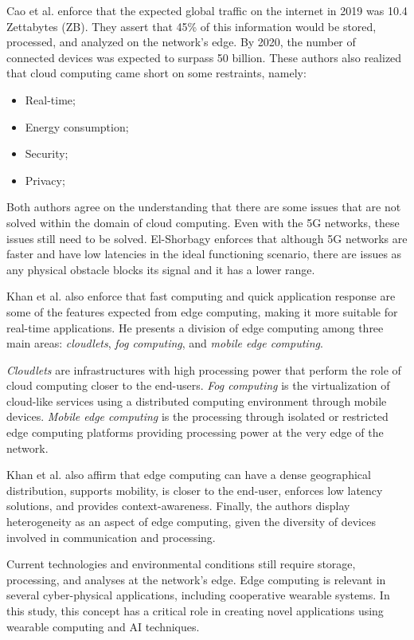 Cao et al. \cite{cao2020overview} enforce that the expected global traffic on the internet in 2019 was 10.4 Zettabytes (ZB). They assert that 45\% of this information would be stored, processed, and analyzed on the network's edge. By 2020, the number of connected devices was expected to surpass 50 billion. These authors also realized that cloud computing came short on some restraints, namely:

\begin{itemize}
    \item Real-time;
    \item Energy consumption;
    \item Security;
    \item Privacy;
\end{itemize}

Both authors agree on the understanding that there are some issues that are not solved within the domain of cloud computing. Even with the 5G networks, these issues still need to be solved. El-Shorbagy \cite{el20215g} enforces that although 5G networks are faster and have low latencies in the ideal functioning scenario, there are issues as any physical obstacle blocks its signal and it has a lower range.

Khan et al. \cite{khan2019edge} also enforce that fast computing and quick application response are some of the features expected from edge computing, making it more suitable for real-time applications. He presents a division of edge computing among three main areas: \textit{cloudlets}, \textit{fog computing}, and \textit{mobile edge computing}. 

\textit{Cloudlets} are infrastructures with high processing power that perform the role of cloud computing closer to the end-users. \textit{Fog computing} is the virtualization of cloud-like services using a distributed computing environment through mobile devices. \textit{Mobile edge computing} is the processing through isolated or restricted edge computing platforms providing processing power at the very edge of the network.

Khan et al. \cite{khan2019edge} also affirm that edge computing can have a dense geographical distribution, supports mobility, is closer to the end-user, enforces low latency solutions, and provides context-awareness. Finally, the authors display heterogeneity as an aspect of edge computing, given the diversity of devices involved in communication and processing.

Current technologies and environmental conditions still require storage, processing, and analyses at the network's edge. Edge computing is relevant in several cyber-physical applications, including cooperative wearable systems. In this study, this concept has a critical role in creating novel applications using wearable computing and AI techniques.

